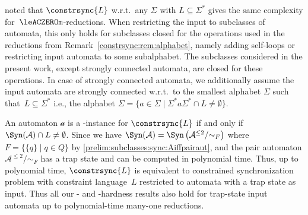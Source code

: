 \begin{remark}
 noted that $\constrsync{L}$ w.r.t.~any $\Sigma$ with $L \subseteq \Sigma^*$
 gives the same complexity for~$\leACZEROm$-reductions.
 When restricting the input to subclasses of automata,
 this only holds for subclasses closed for 
 the operations used in the reductions
 from Remark~\ref{constrsync:rem:alphabet},
 namely adding self-loops or restricting
 input automata to some subalphabet.
 The subclasses considered in the present work, except strongly connected
 automata, are closed for these operations.
 In case of strongly connected automata,
 we additionally assume the input automata
 are strongly connected
 w.r.t.~to the smallest alphabet $\Sigma$
 such that~$L \subseteq \Sigma^*$
 i.e., the alphabet $\Sigma = \{ a \in \Sigma \mid \Sigma^* a \Sigma^* \cap L \ne \emptyset \}$.
% 
% 
\end{remark}

\begin{remark}
	An automaton $\mathcal a$ is a \rYES-instance for $\constrsync{L}$
	if and only if $\Syn(\mathcal A) \cap L \ne \emptyset$.
	Since we have $\Syn(\mathcal A) = \Syn\left(\mathcal A^{\le 2} / {\sim_F}\right)$ where $F = \{\{q\} \mid q \in Q\}$
	by \cref{prelim:subclasses:sync:Aiffpairaut},
	and the pair automaton $\mathcal A^{\le 2} / {\sim_F}$ has a trap state and can be computed 
	in polynomial time. Thus, up to polynomial time,
	$\constrsync{L}$ is equivalent to constrained synchronization problem with constraint language~$L$
	restricted to automata 
	with a trap state as input. Thus all our \NP- and \PSPACE-hardness
	results also hold for trap-state input automata up to polynomial-time many-one
	reductions.
\end{remark}

